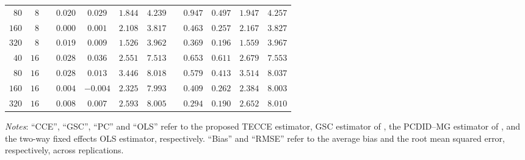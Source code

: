 \documentclass[12pt,fleqn]{article}
\begin{document}
\begin{table}[H]
\begin{tabular}{rrcccccccccc}
   {\small $80$} & {\small $8$} & {\small $$} & {\small $0.020$} & {\small $0.029$} & {\small $1.844$} & {\small $4.239$} & {\small $$} & {\small $0.947$} & {\small $0.497$} & {\small $1.947$} & {\small $4.257$} \\
   {\small $160$} & {\small $8$} & {\small $$} & {\small $0.000$} & {\small $0.001$} & {\small $2.108$} & {\small $3.817$} & {\small $$} & {\small $0.463$} & {\small $0.257$} & {\small $2.167$} & {\small $3.827$} \\
   {\small $320$} & {\small $8$} & {\small $$} & {\small $0.019$} & {\small $0.009$} & {\small $1.526$} & {\small $3.962$} & {\small $$} & {\small $0.369$} & {\small $0.196$} & {\small $1.559$} & {\small $3.967$} \\
   {\small $40$} & {\small $16$} & {\small $$} & {\small $0.028$} & {\small $0.036$} & {\small $2.551$} & {\small $7.513$} & {\small $$} & {\small $0.653$} & {\small $0.611$} & {\small $2.679$} & {\small $7.553$} \\
   {\small $80$} & {\small $16$} & {\small $$} & {\small $0.028$} & {\small $0.013$} & {\small $3.446$} & {\small $8.018$} & {\small $$} & {\small $0.579$} & {\small $0.413$} & {\small $3.514$} & {\small $8.037$} \\
   {\small $160$} & {\small $16$} & {\small $$} & {\small $0.004$} & {\small $-0.004$} & {\small $2.325$} & {\small $7.993$} & {\small $$} & {\small $0.409$} & {\small $0.262$} & {\small $2.384$} & {\small $8.003$} \\
   {\small $320$} & {\small $16$} & {\small $$} & {\small $0.008$} & {\small $0.007$} & {\small $2.593$} & {\small $8.005$} & {\small $$} & {\small $0.294$} & {\small $0.190$} & {\small $2.652$} & {\small $8.010$} \\
  \hline\hline
  \end{tabular}
  \par
      \begin{tablenotes}[flushleft]\small
      \item \textit{Notes}: ``CCE'', ``GSC'', ``PC'' and ``OLS'' refer to the proposed TECCE estimator, GSC estimator of \citet{Xu_2017}, the PCDID--MG estimator of \citet{chan2022pcdid}, and the two-way fixed effects OLS estimator, respectively. ``Bias'' and ``RMSE'' refer to the average bias and the root mean squared error, respectively, across replications.
      \end{tablenotes}
  \end{table}
  
  
  
\end{document}
